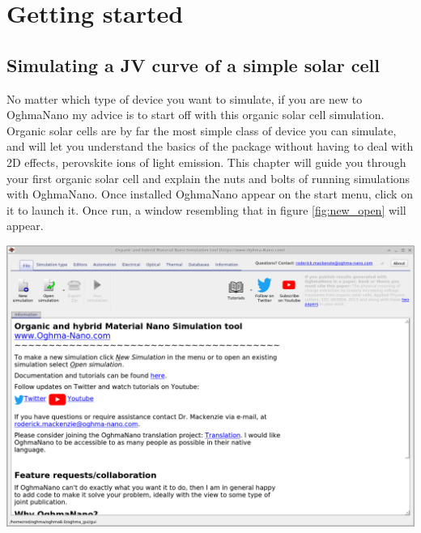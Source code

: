 \chapter{Getting started}
\section{Simulating a JV curve of a simple solar cell}
\begin{minipage}{0.5\textwidth}
No matter which type of device you want to simulate, if you are new to OghmaNano my advice is to start off with this organic solar cell simulation. Organic solar cells are by far the most simple class of device you can simulate, and will let you understand the basics of the package without having to deal with 2D effects, perovskite ions of light emission.  This chapter will guide you through your first organic solar cell and explain the nuts and bolts of running simulations with OghmaNano. Once installed OghmaNano appear on the start menu, click on it to launch it. Once run, a window resembling that in figure \ref{fig:new_open} will appear.
\end{minipage}
\hspace{4pt}
\begin{minipage}[]{0.5\linewidth}
\centering
\includegraphics[width=\textwidth,height=0.7\textwidth]{./images/running/new_open.png}
\label{fig:new_open}
\end{minipage}









